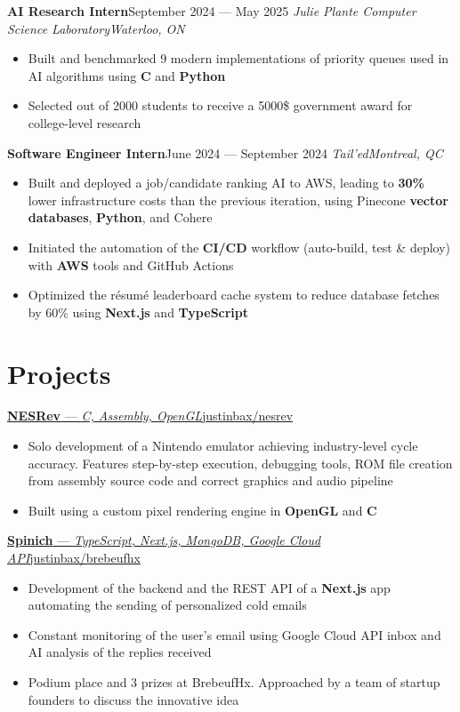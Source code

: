 \documentclass{article}
\newcommand{\newrole}[4]{
    {\normalfont\textbf{#1}\hfill#3}
    \newline
    \textit{#2}\hfill\textit{#4}
}
\newcommand{\shortlinkrole}[4]{
    {\href{#3}{\normalfont\textbf{#1} --- \textit{#2}\hfill#4\:\faExternalLink}\vspace*{-4pt}}
}
\newenvironment{bulletpoints}{\begin{itemize}\setlength\itemsep{-0.2em}}{\end{itemize}}
\begin{document}
\newrole{AI Research Intern}{Julie Plante Computer Science Laboratory}{September 2024 --- May 2025}{Waterloo, ON}
\begin{bulletpoints}
    \item Built and benchmarked 9 modern implementations of priority queues used in AI algorithms using \textbf{C} and \textbf{Python}
    \item Selected out of 2000 students to receive a 5000\$ government award for college-level research
\end{bulletpoints}

\newrole{Software Engineer Intern}{Tail'ed}{June 2024 --- September 2024}{Montreal, QC}
\begin{bulletpoints}
    \item Built and deployed a job/candidate ranking AI to AWS, leading to \textbf{30\%} lower infrastructure costs than the previous iteration, using Pinecone \textbf{vector databases}, \textbf{Python}, and Cohere
    \item Initiated the automation of the \textbf{CI/CD} workflow (auto-build, test \& deploy) with \textbf{AWS} tools and GitHub Actions
    \item Optimized the résumé leaderboard cache system to reduce database fetches by 60\% using \textbf{Next.js} and \textbf{TypeScript}
\end{bulletpoints}


\section*{Projects}

\shortlinkrole{NESRev}{C, Assembly, OpenGL}{https://github.com/justinbax/nesrev}{justinbax/nesrev}
\begin{bulletpoints}
    \item Solo development of a Nintendo emulator achieving industry-level cycle accuracy. Features step-by-step execution, debugging tools, ROM file creation from assembly source code and correct graphics and audio pipeline
    \item Built using a custom pixel rendering engine in \textbf{OpenGL} and \textbf{C}
\end{bulletpoints}

\shortlinkrole{Spinich}{TypeScript, Next.js, MongoDB, Google Cloud API}{https://github.com/justinbax/brebeufhx}{justinbax/brebeufhx}
\begin{bulletpoints}
    \item Development of the backend and the REST API of a \textbf{Next.js} app automating the sending of personalized cold emails
    \item Constant monitoring of the user's email using Google Cloud API inbox and AI analysis of the replies received
    \item Podium place and 3 prizes at BrebeufHx. Approached by a team of startup founders to discuss the innovative idea
\end{bulletpoints}
\end{document}
